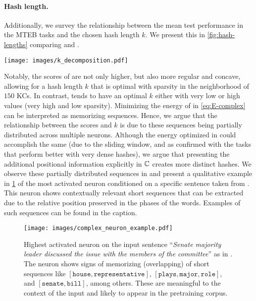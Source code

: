 \paragraph{Hash length.}
Additionally, we survey the relationship between the mean test performance in the MTEB tasks and the chosen hash length $k$.
We present this in \cref{fig:hash-lengths} comparing \flyvec and \methodname.
\begin{figure*}[tb]
    \centering
    \texttt{[image: images/k\_decomposition.pdf]}
    \caption{Test metric averaged over five folds with respect to the hash length $k$ on the STS and PC tasks.
    \methodname shows a better and more regular performance with respect to $k$, plateauing at around $k=150$, while \flyvec tends to perform better on either sparse (low $k$) or dense (high $k$) hashes for these tasks.}
    \label{fig:hash-lengths}
\end{figure*}
Notably, the scores of \methodname are not only higher, but also more regular and concave, allowing for a hash length $k$ that is optimal with sparsity in the neighborhood of $150$ KCs.
In contrast, \flyvec tends to have an optimal $k$ either with very low or high values (very high and low sparsity).
Minimizing the energy of \methodname in \cref{eq:E-complex} can be interpreted as memorizing sequences.
Hence, we argue that the relationship between the scores and $k$ is due to these sequences being partially distributed across multiple neurons.
Although the energy optimized in \flyvec could accomplish the same (due to the sliding window, and as confirmed with the tasks that perform better with very dense hashes), we argue that presenting the additional positional information explicitly in $\mathbb{C}$ creates more distinct hashes.
We observe these partially distributed sequences in \methodname and present a qualitative example in \cref{fig:neuron_ex} of the most activated neuron conditioned on a specific sentence taken from \cite{flyvec}.
This neuron shows contextually relevant short sequences that can be extracted due to the relative position preserved in the phases of the words.
Examples of such sequences can be found in the caption.

\begin{figure}[tb]
    \centering
    \texttt{[image: images/complex\_neuron\_example.pdf]}
    \caption{Highest activated neuron on the input sentence \enquote{\textit{Senate majority leader discussed the issue with the members of the committee}} as in \cite{flyvec}. The neuron shows signs of memorizing (overlapping) of short sequences like $[\texttt{house}, \texttt{representative}]$, $[\texttt{plays}, \texttt{major}, \texttt{role}]$, and $[\texttt{senate}, \texttt{bill}]$, among others. These are meaningful to the context of the input and likely to appear in the pretraining corpus.}
    \label{fig:neuron_ex}
\end{figure}


